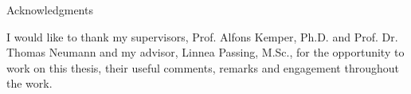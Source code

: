 \thispagestyle{empty}

\vspace*{2cm}

\begin{center}
{ Acknowledgments}
\end{center}

\vspace{1cm}

I would like to thank my supervisors, Prof. Alfons Kemper, Ph.D. and Prof. Dr. Thomas Neumann and my advisor, Linnea Passing, M.Sc., for the opportunity to work on this thesis, their useful comments, remarks and engagement throughout the work.

\cleardoublepage{}
